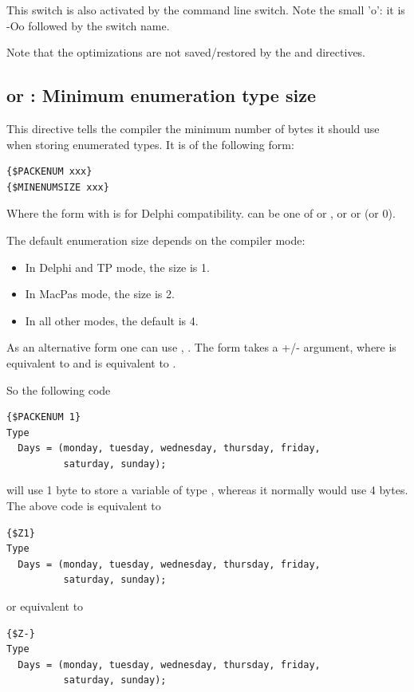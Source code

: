 This switch is also activated by the  command line switch.
Note the small 'o': it is -Oo followed by the switch name.

Note that the optimizations are not saved/restored by the  and
 directives.

\subsection{ or  : Minimum enumeration type size}
\label{se:Packenum}

This directive tells the compiler the minimum number of bytes it should
use when storing enumerated types. It is of the following form:
\begin{verbatim}
{$PACKENUM xxx}
{$MINENUMSIZE xxx}
\end{verbatim}
Where the form with  is for Delphi compatibility.
 can be one of  or , or  or
 (or 0).

The default enumeration size depends on the compiler mode:
\begin{itemize}
\item In Delphi and TP mode, the size is 1.
\item In MacPas mode, the size is 2.
\item In all other modes, the default is 4.
\end{itemize}

As an alternative form one can use , 
. The  form takes a +/- argument, 
where \var{+} is equivalent to  and \var{-} is 
equivalent to .

So the following code
\begin{verbatim}
{$PACKENUM 1}
Type
  Days = (monday, tuesday, wednesday, thursday, friday,
          saturday, sunday);
\end{verbatim}
will use 1 byte to store a variable of type , whereas it normally
would use 4 bytes. The above code is equivalent to
\begin{verbatim}
{$Z1}
Type
  Days = (monday, tuesday, wednesday, thursday, friday,
          saturday, sunday);
\end{verbatim}
or equivalent to
\begin{verbatim}
{$Z-}
Type
  Days = (monday, tuesday, wednesday, thursday, friday,
          saturday, sunday);
\end{verbatim}

